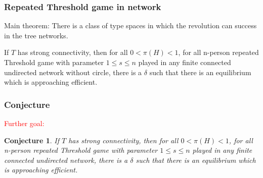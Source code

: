 \documentclass{beamer}
\newtheorem{conjecture}{Conjecture}[section]
\begin{document}
\begin{frame}
  \frametitle{Repeated Threshold game in network}

{\color{red}Main theorem}: There is a class of type spaces in which the revolution can success in the tree networks. 

\begin{theorem}
{\color{red} If} $T$ has strong connectivity, {\color{red} then} for all $0<\pi(H)<1$, for all n-person repeated Threshold game with parameter $1\leq s \leq n$ played in any finite connected undirected network {\color{red} without circle}, there is a $\delta$ such that there is an equilibrium which is approaching efficient.
\end{theorem}


\end{frame}



\begin{frame}
  \frametitle{Conjecture}
  \textcolor{red}{Further goal:}
\begin{conjecture}
{\color{red} If} $T$ has strong connectivity, {\color{red} then} for all $0<\pi(H)<1$, for all n-person repeated Threshold game with parameter $1\leq s \leq n$ played in any finite connected undirected network, there is a $\delta$ such that there is an equilibrium which is approaching efficient.
\end{conjecture}
\end{frame}
\end{document}
